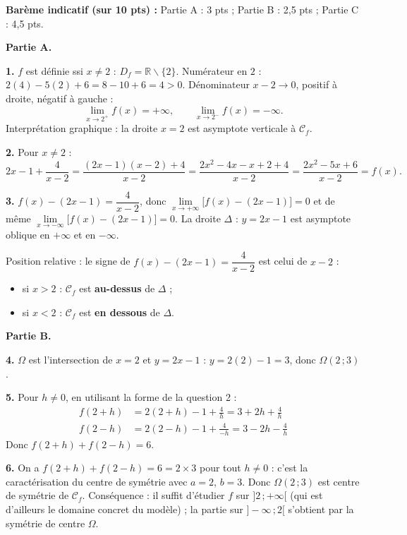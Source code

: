 \documentclass[11pt]{article}
\newcommand{\cle}[1]{{\popxbold\color{popdark}#1}}
\def\setminus{\mathbin{\backslash}}\let\smallsetminus\setminus
\begin{document}
\begin{corrige}
\textbf{Barème indicatif (sur 10 pts) :} Partie A : 3 pts ; Partie B : 2,5 pts ; Partie C : 4,5 pts.

\textbf{Partie A.}

\textbf{1.} $f$ est définie ssi $x\neq 2$ : $D_f=\mathbb{R}\setminus\{2\}$. Numérateur en $2$ : $2(4)-5(2)+6=8-10+6=4>0$. Dénominateur $x-2\to 0$, positif à droite, négatif à gauche :
\[ \lim_{x\to 2^+}f(x)=+\infty, \qquad \lim_{x\to 2^-}f(x)=-\infty. \]
Interprétation graphique : la droite $\boxed{x=2}$ est \cle{asymptote verticale} à $\mathcal{C}_f$.

\textbf{2.} Pour $x\neq 2$ :
\[ 2x-1+\frac{4}{x-2}=\frac{(2x-1)(x-2)+4}{x-2}=\frac{2x^2-4x-x+2+4}{x-2}=\frac{2x^2-5x+6}{x-2}=f(x). \]

\textbf{3.} $f(x)-(2x-1)=\dfrac{4}{x-2}$, donc $\lim\limits_{x\to+\infty}\bigl[f(x)-(2x-1)\bigr]=0$ et de même $\lim\limits_{x\to-\infty}\bigl[f(x)-(2x-1)\bigr]=0$. La droite $\Delta$ : $\boxed{y=2x-1}$ est \cle{asymptote oblique} en $+\infty$ et en $-\infty$.

Position relative : le signe de $f(x)-(2x-1)=\dfrac{4}{x-2}$ est celui de $x-2$ :
\begin{itemize}
\item si $x>2$ : $\mathcal{C}_f$ est \textbf{au-dessus} de $\Delta$ ;
\item si $x<2$ : $\mathcal{C}_f$ est \textbf{en dessous} de $\Delta$.
\end{itemize}

\textbf{Partie B.}

\textbf{4.} $\Omega$ est l'intersection de $x=2$ et $y=2x-1$ : $y=2(2)-1=3$, donc $\boxed{\Omega(2\,;3)}$.

\textbf{5.} Pour $h\neq 0$, en utilisant la forme de la question 2 :
\begin{align*}
f(2+h)&=2(2+h)-1+\frac{4}{h}=3+2h+\frac{4}{h}\\
f(2-h)&=2(2-h)-1+\frac{4}{-h}=3-2h-\frac{4}{h}
\end{align*}
Donc $f(2+h)+f(2-h)=6$.

\textbf{6.} On a $f(2+h)+f(2-h)=6=2\times 3$ pour tout $h\neq 0$ : c'est la caractérisation du \cle{centre de symétrie} avec $a=2$, $b=3$. Donc $\boxed{\Omega(2\,;3)}$ est centre de symétrie de $\mathcal{C}_f$. Conséquence : il suffit d'étudier $f$ sur $]2\,;+\infty[$ (qui est d'ailleurs le domaine concret du modèle) ; la partie sur $]-\infty\,;2[$ s'obtient par la symétrie de centre $\Omega$.


\end{corrige}
\end{document}
